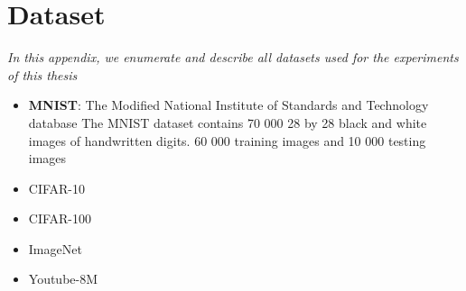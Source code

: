 \chapter{Dataset}
\label{appendix:ap5-datasets}

\emph{In this appendix, we enumerate and describe all datasets used for the experiments of this thesis}

\begin{itemize}
  \item \textbf{MNIST}: The Modified National Institute of Standards and Technology database \cite{lecun1998gradient}
    The MNIST dataset contains 70 000 28 by 28 black and white images of handwritten digits.
    60 000 training images and 10 000 testing images 
  \item CIFAR-10
  \item CIFAR-100
  \item ImageNet
  \item Youtube-8M
\end{itemize}

